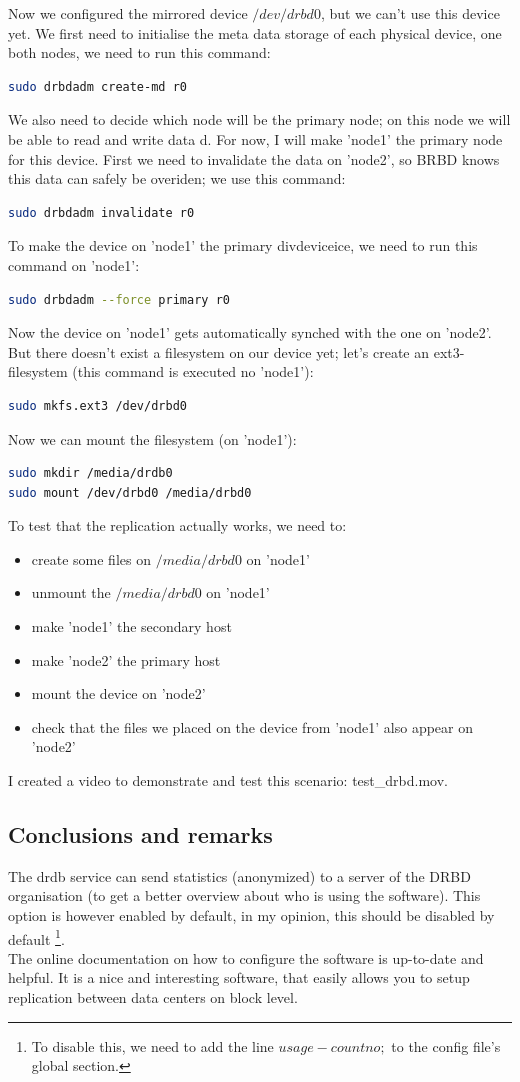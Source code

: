 \documentclass[12pt]{report}
\begin{document}
Now we configured the mirrored device $/dev/drbd0$, but we can't use
this device yet.
We first need to initialise the meta data storage of each physical
device,
one both nodes, we need to run this command:
\begin{lstlisting}[language=bash]
sudo drbdadm create-md r0
\end{lstlisting}
We also need to decide which node will be the primary node; on this
node we will be able to read and write data d.
For now, I will make 'node1' the primary node for this device.
First we need to invalidate the data on 'node2', so BRBD knows this
data can safely be overiden; we use this command:
\begin{lstlisting}[language=bash]
sudo drbdadm invalidate r0
\end{lstlisting}
To make the device on 'node1' the primary divdeviceice,
we need to run this command on 'node1':
\begin{lstlisting}[language=bash]
sudo drbdadm --force primary r0
\end{lstlisting}
Now the device on 'node1' gets automatically synched with the one on
'node2'. But there doesn't exist a filesystem on our device yet; let's
create an ext3-filesystem (this command is executed no 'node1'):
\begin{lstlisting}[language=bash]
sudo mkfs.ext3 /dev/drbd0
\end{lstlisting}
Now we can mount the filesystem (on 'node1'):
\begin{lstlisting}[language=bash]
sudo mkdir /media/drdb0
sudo mount /dev/drbd0 /media/drbd0 
\end{lstlisting}
To test that the replication actually works, we need to:
\begin{itemize}
\item create some files on $/media/drbd0$ on 'node1'
\item unmount the $/media/drbd0$ on 'node1'
\item make 'node1' the secondary host
\item make 'node2' the primary host
\item mount the device on 'node2'
\item check that the files we placed on the device from 'node1' also
  appear on 'node2'
\end{itemize}

I created a video to demonstrate and test this scenario:
test\_drbd.mov.

\subsection{Conclusions and remarks}
The drdb service can send statistics (anonymized) to a
server of the DRBD organisation (to get a better overview about who is
using the software). This option is however enabled by
default, in my opinion, this should be disabled by default
\footnote{To disable this, we need to add the line $usage-count no;$
  to the config file's global section.}.\\
The online documentation on how to configure the software is
up-to-date and helpful. It is a nice and interesting software, that easily allows you
to setup replication between data centers on block level.
\end{document}

